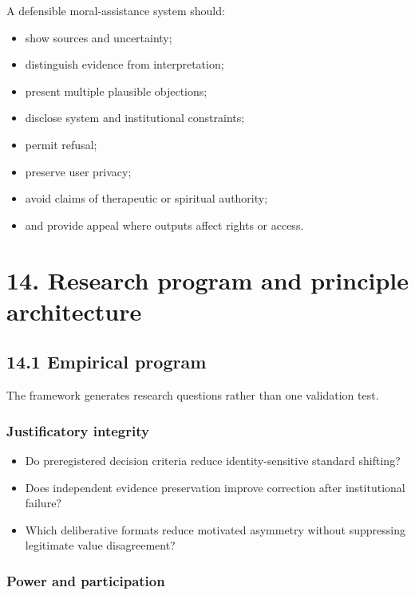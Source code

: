 \documentclass[
  11pt,
]{article}
\providecommand{\tightlist}{%
  \setlength{\itemsep}{0pt}\setlength{\parskip}{0pt}}
\begin{document}
A defensible moral-assistance system should:

\begin{itemize}
\tightlist
\item
  show sources and uncertainty;
\item
  distinguish evidence from interpretation;
\item
  present multiple plausible objections;
\item
  disclose system and institutional constraints;
\item
  permit refusal;
\item
  preserve user privacy;
\item
  avoid claims of therapeutic or spiritual authority;
\item
  and provide appeal where outputs affect rights or access.
\end{itemize}

\section{14. Research program and principle
architecture}\label{research-program-and-principle-architecture}

\subsection{14.1 Empirical program}\label{empirical-program}

The framework generates research questions rather than one validation
test.

\subsubsection{Justificatory integrity}\label{justificatory-integrity}

\begin{itemize}
\tightlist
\item
  Do preregistered decision criteria reduce identity-sensitive standard
  shifting?
\item
  Does independent evidence preservation improve correction after
  institutional failure?
\item
  Which deliberative formats reduce motivated asymmetry without
  suppressing legitimate value disagreement?
\end{itemize}

\subsubsection{Power and participation}\label{power-and-participation}
\end{document}
